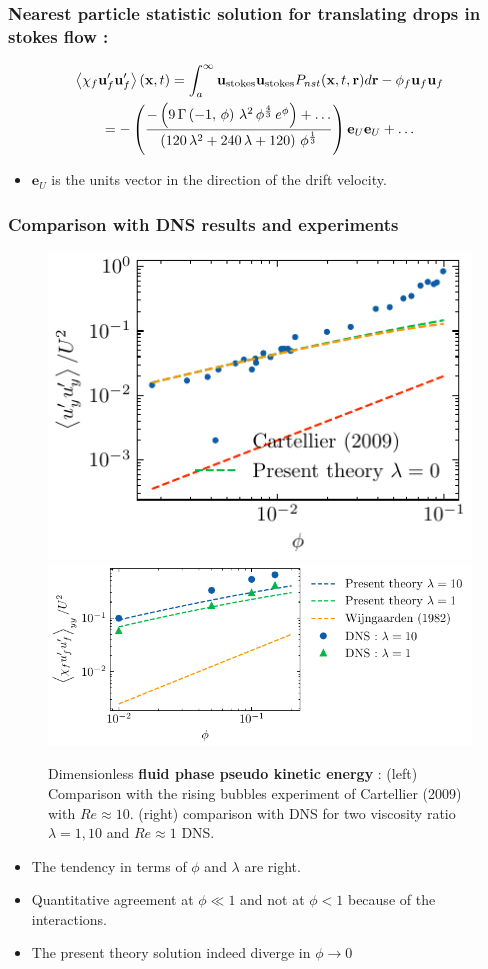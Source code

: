 \documentclass{sintefbeamer}
\begin{document}
\begin{frame}
  \frametitle{Nearest particle statistic solution for translating drops in stokes flow :}
  \begin{multline}
    \left<\chi_f \textbf{u}'_f\textbf{u}'_f\right>(\textbf{x},t)
    = 
    {\int_a^\infty \textbf{u}_\text{stokes} \textbf{u}_\text{stokes}  P_{nst}(\textbf{x},t,\textbf{r}) d\textbf{r} }
    - \phi_f \textbf{u}_f\textbf{u}_f
    \\=
-\left({{-\left(9\,\Gamma\left(-1 , \,\phi\right)\,\lambda^2\,\phi
^{{{4}\over{3}}}\,e^{\phi}\right)+\ldots}\over{\left(120\,\lambda^2+240\,\lambda+
120\right)\,\phi^{{{1}\over{3}}}}}\right)
\textbf{e}_U\textbf{e}_U + \ldots
\end{multline}
\begin{itemize}
  \item $\textbf{e}_U$ is the units vector in the direction of the drift velocity. 
\end{itemize}

\end{frame}

\begin{frame}
  \frametitle{Comparison with DNS results and experiments}
  \begin{figure}[h!]
    \centering    
    \includegraphics[height = 0.25\textwidth]{image/HOMOGENEOUS/fCA/cartellier.pdf}
    \includegraphics[height = 0.25\textwidth]{image/HOMOGENEOUS/fCA/Pseudo_turbe.pdf}
    \caption{
       Dimensionless \textbf{fluid phase pseudo kinetic energy} :
       (left) Comparison with the rising bubbles experiment of Cartellier (2009) with $Re \approx 10$. 
       (right) comparison with DNS for two viscosity ratio $\lambda =1,10$ and $Re \approx 1$ DNS. 
    }
    \label{fig:Cp}
\end{figure}  
\begin{itemize}
  \item The tendency in terms of $\phi$ and $\lambda$ are right.  
  \item Quantitative agreement at $\phi \ll 1$ and not at $\phi <1$ because of the interactions.  
  \item The present theory solution indeed diverge in $\phi \to 0$ 
\end{itemize}
\end{frame}
\end{document}
